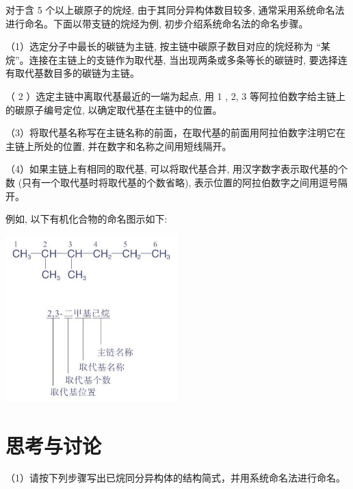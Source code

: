 \documentclass[10pt]{article}
\begin{document}
对于含 5 个以上碳原子的烷烃, 由于其同分异构体数目较多, 通常采用系统命名法进行命名。下面以带支链的烷烃为例, 初步介绍系统命名法的命名步骤。

（1）选定分子中最长的碳链为主链, 按主链中碳原子数目对应的烷烃称为 “某烷”。连接在主链上的支链作为取代基, 当出现两条或多条等长的碳链时, 要选择连有取代基数目多的碳链为主链。

（ 2 ）选定主链中离取代基最近的一端为起点, 用 1 , 2, 3 等阿拉伯数字给主链上的碳原子编号定位, 以确定取代基在主链中的位置。

（3）将取代基名称写在主链名称的前面，在取代基的前面用阿拉伯数字注明它在主链上所处的位置, 并在数字和名称之间用短线隔开。

（4）如果主链上有相同的取代基, 可以将取代基合并, 用汉字数字表示取代基的个数 (只有一个取代基时将取代基的个数省略), 表示位置的阿拉伯数字之间用逗号隔开。

例如, 以下有机化合物的命名图示如下:

\begin{center}
\includegraphics[max width=0.5\textwidth]{images/0190efc5-b58a-7c43-bfb0-e0a030df9cfd_37_693325.jpg}
\end{center}

\section*{思考与讨论}

（1）请按下列步骤写出已烷同分异构体的结构简式，并用系统命名法进行命名。

\begin{center}
\end{center}
\end{document}
